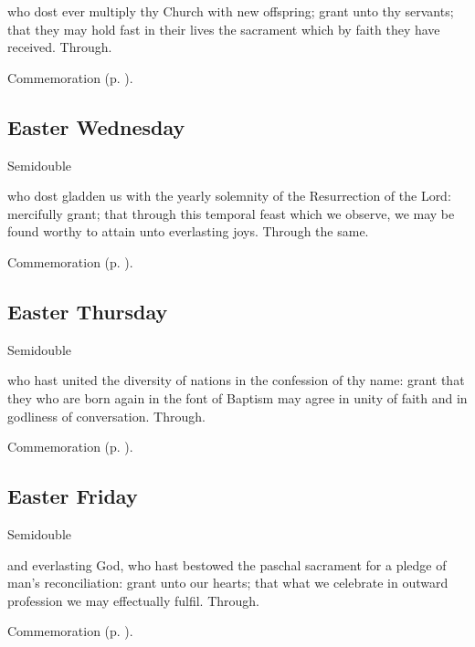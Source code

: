\collect
{} who dost ever multiply thy Church with new offspring; grant unto thy servants; that they may hold fast in their lives the sacrament which by faith they have received. Through.
\begin{rubric}
    Commemoration  (p. \pageref{EasterCollect}).
\end{rubric}


\subsection{Easter Wednesday}
\begin{inhead}
    {Semidouble}
\end{inhead}

\collect
{} who dost gladden us with the yearly solemnity of the Resurrection of the Lord: mercifully grant; that through this temporal feast which we observe, we may be found worthy to attain unto everlasting joys. Through the same.
\begin{rubric}
    Commemoration  (p. \pageref{EasterCollect}).
\end{rubric}


\subsection{Easter Thursday}
\begin{inhead}
    {Semidouble}
\end{inhead}

\collect
{} who hast united the diversity of nations in the confession of thy name: grant that they who are born again in the font of Baptism may agree in unity of faith and in godliness of conversation. Through.
\begin{rubric}
    Commemoration  (p. \pageref{EasterCollect}).
\end{rubric}


\subsection{Easter Friday}
\begin{inhead}
    {Semidouble}
\end{inhead}

\collect
{} and everlasting God, who hast bestowed the paschal sacrament for a pledge of man's reconciliation: grant unto our hearts; that what we celebrate in outward profession we may effectually fulfil. Through.
\begin{rubric}
    Commemoration  (p. \pageref{EasterCollect}).
\end{rubric}



